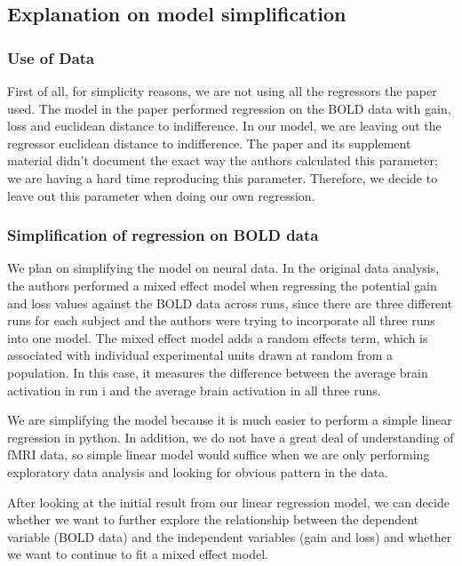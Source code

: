 \subsection{Explanation on model simplification}

\subsubsection{Use of Data}
\indent \indent First of all, for simplicity reasons, we are not using all the regressors the paper used. The model in the paper performed regression on the BOLD data with gain, loss and euclidean distance to indifference. In our model, we are leaving out the regressor euclidean distance to indifference. The paper and its supplement material didn't document the exact way the authors calculated this parameter; we are having a hard time reproducing this parameter. Therefore, we decide to leave out this parameter when doing our own regression.

\subsubsection{Simplification of regression on BOLD data}

\indent \indent We plan on simplifying the model on neural data. In the original data analysis, the authors performed a mixed effect model when regressing the potential gain and loss values against the BOLD data across runs, since there are three different runs for each subject and the authors were trying to incorporate all three runs into one model. The mixed effect model adds a random effects term, which is associated with individual experimental units drawn at random from a population. In this case, it measures the difference between the average brain activation in run i and the average brain activation in all three runs.

We are simplifying the model because it is much easier to perform a simple linear regression in python. In addition, we do not have a great deal of understanding of fMRI data, so simple linear model would suffice when we are only performing exploratory data analysis and looking for obvious pattern in the data.

After looking at the initial result from our linear regression model, we can decide whether we want to further explore the relationship between the dependent variable (BOLD data) and the independent variables (gain and loss) and whether we want to continue to fit a mixed effect model.

